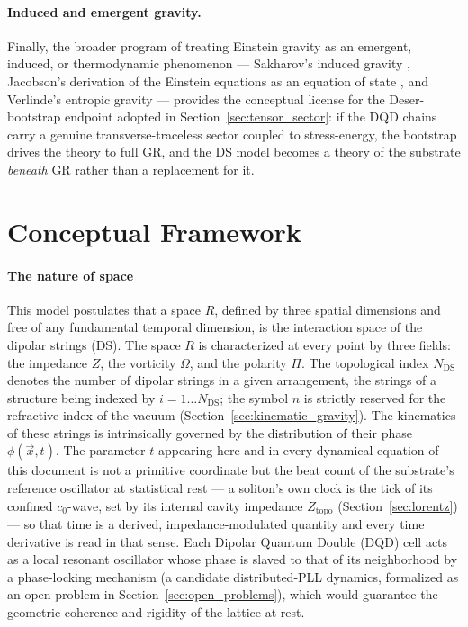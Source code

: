 \documentclass[11pt,a4paper]{article}
\theoremstyle{plain}
\theoremstyle{remark}
\newcommand{\Ncd}{\ensuremath{N_{\mathrm{DS}}}}
\begin{document}
\paragraph{Induced and emergent gravity.} Finally, the broader program of treating Einstein gravity as an emergent, induced, or thermodynamic phenomenon --- Sakharov's induced gravity \cite{sakharov}, Jacobson's derivation of the Einstein equations as an equation of state \cite{jacobson1995}, and Verlinde's entropic gravity \cite{verlinde2011} --- provides the conceptual license for the Deser-bootstrap endpoint adopted in Section~\ref{sec:tensor_sector}: if the DQD chains carry a genuine transverse-traceless sector coupled to stress-energy, the bootstrap drives the theory to full GR, and the DS model becomes a theory of the substrate \emph{beneath} GR rather than a replacement for it.

\section{Conceptual Framework}
\label{sec:conceptual}

\paragraph{The nature of space}
This model postulates that a space $R$, defined by three spatial dimensions and free of any fundamental temporal dimension, is the interaction space of the dipolar strings (DS). The space $R$ is characterized at every point by three fields: the impedance $Z$, the vorticity $\Omega$, and the polarity $\Pi$. The topological index $\Ncd$ denotes the number of dipolar strings in a given arrangement, the strings of a structure being indexed by $i = 1 \ldots \Ncd$; the symbol $n$ is strictly reserved for the refractive index of the vacuum (Section~\ref{sec:kinematic_gravity}). The kinematics of these strings is intrinsically governed by the distribution of their phase $\phi(\vec{x},t)$. The parameter $t$ appearing here and in every dynamical equation of this document is not a primitive coordinate but the beat count of the substrate's reference oscillator at statistical rest --- a soliton's own clock is the tick of its confined $c_0$-wave, set by its internal cavity impedance $Z_{\text{topo}}$ (Section~\ref{sec:lorentz}) --- so that time is a derived, impedance-modulated quantity and every time derivative is read in that sense. Each Dipolar Quantum Double (DQD) cell acts as a local resonant oscillator whose phase is slaved to that of its neighborhood by a phase-locking mechanism (a candidate distributed-PLL dynamics, formalized as an open problem in Section~\ref{sec:open_problems}), which would guarantee the geometric coherence and rigidity of the lattice at rest.
\end{document}

